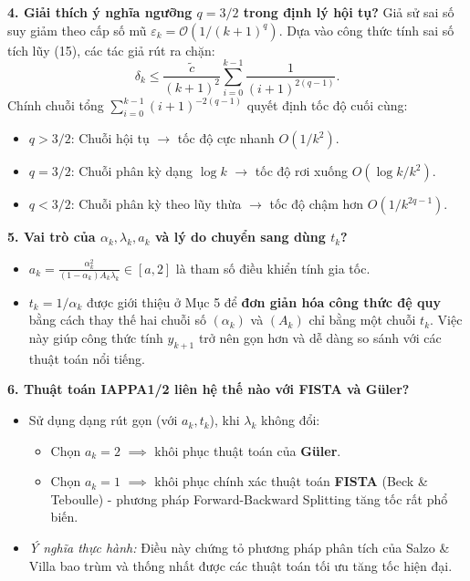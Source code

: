﻿\documentclass[12pt]{article}
\begin{document}
\textbf{4. Giải thích ý nghĩa ngưỡng \(q = 3/2\) trong định lý hội tụ?}
Giả sử sai số suy giảm theo cấp số mũ \(\varepsilon_k = \mathcal{O}(1/(k+1)^q)\). Dựa vào công thức tính sai số tích lũy (15), các tác giả rút ra chặn:
\begin{equation*}
    \delta_k \le \frac{\tilde{c}}{(k+1)^2} \sum_{i=0}^{k-1} \frac{1}{(i+1)^{2(q-1)}}.
\end{equation*}
Chính chuỗi tổng \(\sum_{i=0}^{k-1} (i+1)^{-2(q-1)}\) quyết định tốc độ cuối cùng:
\begin{itemize}
    \item \(q > 3/2\): Chuỗi hội tụ \(\to\) tốc độ cực nhanh \(O(1/k^2)\).
    \item \(q = 3/2\): Chuỗi phân kỳ dạng \(\log k\) \(\to\) tốc độ rơi xuống \(O(\log k / k^2)\).
    \item \(q < 3/2\): Chuỗi phân kỳ theo lũy thừa \(\to\) tốc độ chậm hơn \(O(1/k^{2q-1})\).
\end{itemize}

\textbf{5. Vai trò của \(\alpha_k, \lambda_k, a_k\) và lý do chuyển sang dùng \(t_k\)?}
\begin{itemize}
    \item \(a_k = \frac{\alpha_k^2}{(1-\alpha_k)A_k\lambda_k} \in [a, 2]\) là tham số điều khiển tính gia tốc.
    \item \(t_k = 1/\alpha_k\) được giới thiệu ở Mục 5 để \textbf{đơn giản hóa công thức đệ quy} bằng cách thay thế hai chuỗi số \((\alpha_k)\) và \((A_k)\) chỉ bằng một chuỗi \(t_k\). Việc này giúp công thức tính \(y_{k+1}\) trở nên gọn hơn và dễ dàng so sánh với các thuật toán nổi tiếng.
\end{itemize}

\textbf{6. Thuật toán IAPPA1/2 liên hệ thế nào với FISTA và Güler?}
\begin{itemize}
    \item Sử dụng dạng rút gọn (với \(a_k, t_k\)), khi \(\lambda_k\) không đổi:
    \begin{itemize}
        \item Chọn \(a_k = 2\) \(\implies\) khôi phục thuật toán của \textbf{Güler}.
        \item Chọn \(a_k = 1\) \(\implies\) khôi phục chính xác thuật toán \textbf{FISTA} (Beck \& Teboulle) - phương pháp Forward-Backward Splitting tăng tốc rất phổ biến.
    \end{itemize}
    \item \textit{Ý nghĩa thực hành:} Điều này chứng tỏ phương pháp phân tích của Salzo \& Villa bao trùm và thống nhất được các thuật toán tối ưu tăng tốc hiện đại.
\end{itemize}
\end{document}
